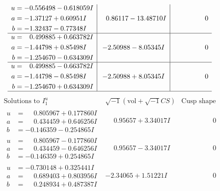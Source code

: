 \documentclass[1p]{elsarticle_modified}
\theoremstyle{definition}
\newcommand{\I}{\sqrt{-1}}
\begin{document}
$$\begin{array}{c|c|c}
\begin{aligned}
u &= -0.556498 - 0.618059 I \\
a &= -1.37127 + 0.60951 I \\
b &= -1.32437 - 0.77348 I\end{aligned}
 & \phantom{-}0.86117 - 13.48710 I & \phantom{-0.000000 } 0 \\ \hline\begin{aligned}
u &= \phantom{-}0.499885 + 0.663782 I \\
a &= -1.44798 + 0.85498 I \\
b &= -1.254670 - 0.634309 I\end{aligned}
 & -2.50988 - 8.05345 I & \phantom{-0.000000 } 0 \\ \hline\begin{aligned}
u &= \phantom{-}0.499885 - 0.663782 I \\
a &= -1.44798 - 0.85498 I \\
b &= -1.254670 + 0.634309 I\end{aligned}
 & -2.50988 + 8.05345 I & \phantom{-0.000000 } 0\\
 \hline 
 \end{array}$$\newpage$$\begin{array}{c|c|c}  
\text{Solutions to }I^u_{1}& \I (\text{vol} + \sqrt{-1}CS) & \text{Cusp shape}\\
 \hline 
\begin{aligned}
u &= \phantom{-}0.805967 + 0.177860 I \\
a &= \phantom{-}0.434459 + 0.646256 I \\
b &= -0.146359 - 0.254865 I\end{aligned}
 & \phantom{-}0.95657 + 3.34017 I & \phantom{-0.000000 } 0 \\ \hline\begin{aligned}
u &= \phantom{-}0.805967 - 0.177860 I \\
a &= \phantom{-}0.434459 - 0.646256 I \\
b &= -0.146359 + 0.254865 I\end{aligned}
 & \phantom{-}0.95657 - 3.34017 I & \phantom{-0.000000 } 0 \\ \hline\begin{aligned}
u &= -0.730148 + 0.325441 I \\
a &= \phantom{-}0.689403 + 0.803956 I \\
b &= \phantom{-}0.248934 + 0.487387 I\end{aligned}
 & -2.34065 + 1.51221 I & \phantom{-0.000000 } 0 \\ \hline\begin{aligned}

\end{aligned}
\end{array}$$
\end{document}
